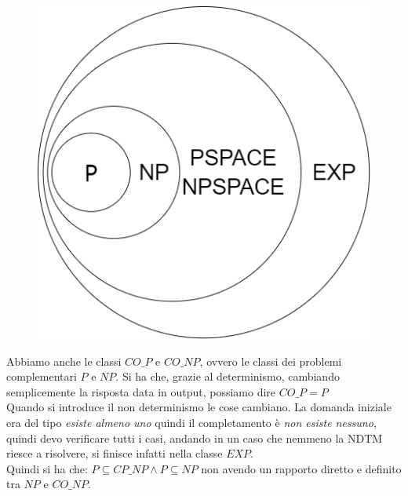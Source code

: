 \begin{figure}[H]
    \centering
    \includegraphics[scale = .3]{imm/Untitled Diagram.png}
\end{figure}


Abbiamo anche le classi $CO\_P$ e $CO\_NP$, ovvero le classi dei problemi complementari $P$ e $NP$. Si ha che, grazie al determinismo, cambiando semplicemente la risposta data in output, possiamo dire $CO\_P=P$\\
Quando si introduce il non determinismo le cose cambiano. La domanda iniziale era del tipo \textit{esiste almeno uno} quindi il completamento è \textit{non esiste nessuno}, quindi devo verificare tutti i casi, andando in un caso che nemmeno la NDTM riesce a risolvere, si finisce infatti nella classe $EXP$. \\ Quindi si ha che:
$P\subseteq CP\_NP\land P\subseteq NP$ non avendo un rapporto diretto e definito tra $NP$ e $CO\_NP$.
